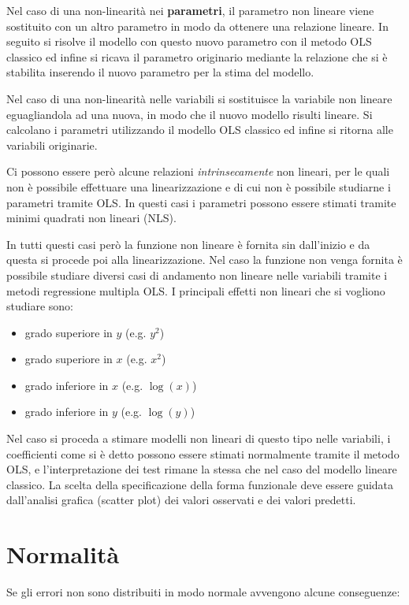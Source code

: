 Nel caso di una non-linearità nei \textbf{parametri}, il parametro non lineare viene sostituito con un altro parametro in modo da ottenere una relazione lineare. In seguito si risolve il modello con questo nuovo parametro con il metodo OLS classico ed infine si ricava il parametro originario mediante la relazione che si è stabilita inserendo il nuovo parametro per la stima del modello.

Nel caso di una non-linearità nelle variabili si sostituisce la variabile non lineare eguagliandola ad una nuova, in modo che il nuovo modello risulti lineare. Si calcolano i parametri utilizzando il modello OLS classico ed infine si ritorna alle variabili originarie.

Ci possono essere però alcune relazioni \textit{intrinsecamente} non lineari, per le quali non è possibile effettuare una linearizzazione e di cui non è possibile studiarne i parametri tramite OLS. In questi casi i parametri possono essere stimati tramite minimi quadrati non lineari (NLS).

In tutti questi casi però la funzione non lineare è fornita sin dall'inizio e da questa si procede poi alla linearizzazione. Nel caso la funzione non venga fornita è possibile studiare diversi casi di andamento non lineare nelle variabili tramite i metodi regressione multipla OLS. I principali effetti non lineari che si vogliono studiare sono:
\begin{itemize}
	\item grado superiore in $y$ (e.g. $y^2$)
	\item grado superiore in $x$ (e.g. $x^2$)
	\item grado inferiore in $x$ (e.g. $\log(x)$)
	\item grado inferiore in $y$ (e.g. $\log(y)$)
\end{itemize}
Nel caso si proceda a stimare modelli non lineari di questo tipo nelle variabili, i coefficienti come si è detto possono essere stimati normalmente tramite il metodo OLS, e l'interpretazione dei test rimane la stessa che nel caso del modello lineare classico. La scelta della specificazione della forma funzionale deve essere guidata dall'analisi grafica (scatter plot) dei valori osservati e dei valori predetti.

\section{Normalità}
Se gli errori non sono distribuiti in modo normale avvengono alcune conseguenze:

